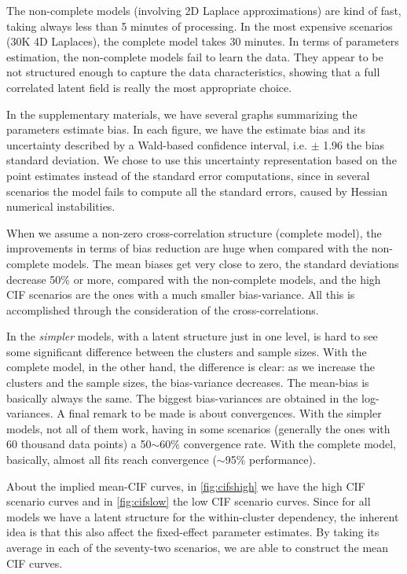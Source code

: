 \documentclass[a4paper,12pt]{article}
\begin{document}
The non-complete models (involving 2D Laplace approximations) are kind
of fast, taking always less than 5 minutes of processing. In the most
expensive scenarios (30K 4D Laplaces), the complete model takes 30
minutes. In terms of parameters estimation, the non-complete models fail
to learn the data. They appear to be not structured enough to capture
the data characteristics, showing that a full correlated latent field is
really the most appropriate choice.

In the supplementary materials, we have several graphs summarizing the
parameters estimate bias. In each figure, we have the estimate bias and
its uncertainty described by a Wald-based confidence interval,
i.e. \(\pm\) 1.96 the bias standard deviation. We chose to use this
uncertainty representation based on the point estimates instead of the
standard error computations, since in several scenarios the model fails
to compute all the standard errors, caused by Hessian numerical
instabilities.

When we assume a non-zero cross-correlation structure (complete model),
the improvements in terms of bias reduction are huge when compared with
the non-complete models. The mean biases get very close to zero, the
standard deviations decrease 50\% or more, compared with the
non-complete models, and the high CIF scenarios are the ones with a much
smaller bias-variance. All this is accomplished through the
consideration of the cross-correlations.

In the \textit{simpler} models, with a latent structure just in one
level, is hard to see some significant difference between the clusters
and sample sizes. With the complete model, in the other hand, the
difference is clear: as we increase the clusters and the sample sizes,
the bias-variance decreases. The mean-bias is basically always the same.
The biggest bias-variances are obtained in the log-variances. A final
remark to be made is about convergences. With the simpler models, not
all of them work, having in some scenarios (generally the ones with 60
thousand data points) a 50\(\sim\)60\% convergence rate. With the
complete model, basically, almost all fits reach convergence
(\(\sim\)95\% performance).

About the implied mean-CIF curves, in \autoref{fig:cifshigh} we have the
high CIF scenario curves and in \autoref{fig:cifslow} the low CIF
scenario curves. Since for all models we have a latent structure for the
within-cluster dependency, the inherent idea is that this also affect
the fixed-effect parameter estimates. By taking its average in each of
the seventy-two scenarios, we are able to construct the mean CIF curves.
\end{document}
